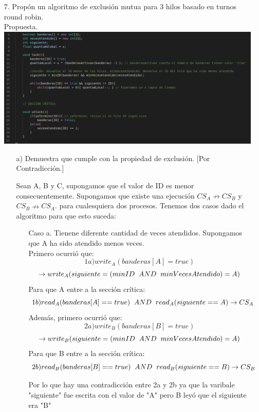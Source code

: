 \documentclass[12pt, letterpaper]{article}
\begin{document}
\begin{itemize}
\item[7. ] Propón un algoritmo de exclusión mutua para 3 hilos basado en turnos round robin.\\
Propuesta.\\
\includegraphics[width=\textwidth]{EM}\\
\begin{itemize}
\item[a) ] Demuestra que cumple con la propiedad de exclusión.
[Por Contradicción.]

Sean A, B y C, supongamos que el valor de ID es menor consecuentemente.
Supongamos que existe una ejecución $CS_A \nrightarrow CS_B$ y $CS_B \nrightarrow CS_A$.
para cualesquiera dos procesos. Tenemos dos casos dado el algoritmo para que esto suceda:
\begin{itemize}
\item[Caso a. ] Tienene diferente cantidad de veces atendidos. Supongamos que A ha sido atendido menos veces.\\
Primero ocurrió que:
\[1a)write_A(banderas[A] = true)\] \[ \rightarrow write_A(siguiente = (minID\hspace{0.2cm}AND \hspace{0.2cm}minVecesAtendido) = A)\]
Para que A entre a la sección crítica:
\[1b) read_A(banderas[A] == true)\hspace{0.2cm}AND\hspace{0.2cm}read_A(siguiente == A) \rightarrow CS_A\]
Además, primero ocurrió que:
\[2a)write_B(banderas[B] = true)\] \[ \rightarrow write_B(siguiente = (minID\hspace{0.2cm}AND \hspace{0.2cm}minVecesAtendido) = A)\]
Para que B entre a la sección crítica:
\[2b) read_B(banderas[B] == true)\hspace{0.2cm}AND\hspace{0.2cm}read_B(siguiente == B) \rightarrow CS_B\]

Por lo que hay una contradicción entre 2a y 2b ya que la varibale "siguiente" fue escrita con el valor de "A" pero B leyó que el siguiente era "B"


\end{itemize}
\end{itemize}
\end{itemize}
\end{document}
